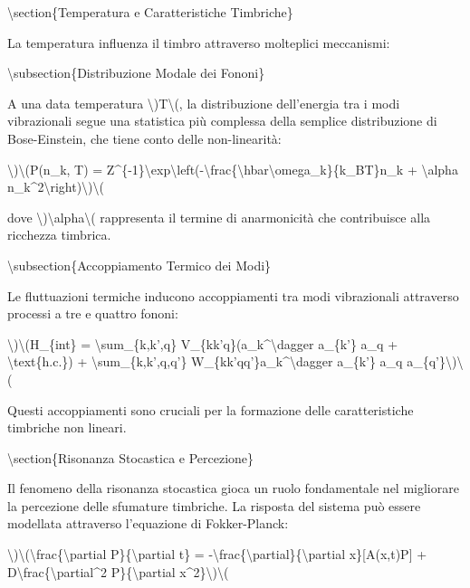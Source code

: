 \documentclass[a4paper,11pt]{article}
\begin{document}
\textbackslash{}section\{Temperatura e Caratteristiche Timbriche\}

La temperatura influenza il timbro attraverso molteplici meccanismi:

\textbackslash{}subsection\{Distribuzione Modale dei Fononi\}

A una data temperatura \textbackslash{})T\textbackslash{}(, la distribuzione dell'energia tra i modi
vibrazionali segue una statistica pi\`u complessa della semplice
distribuzione di Bose-Einstein, che tiene conto delle non-linearit\`a:

\textbackslash{})\textbackslash{}(P(n\_k, T) = Z\textasciicircum{}\{-1\}\textbackslash{}exp\textbackslash{}left(-\textbackslash{}frac\{\textbackslash{}hbar\textbackslash{}omega\_k\}\{k\_BT\}n\_k + \textbackslash{}alpha n\_k\textasciicircum{}2\textbackslash{}right)\textbackslash{})\textbackslash{}(

dove \textbackslash{})\textbackslash{}alpha\textbackslash{}( rappresenta il termine di anarmonicit\`a che contribuisce
alla ricchezza timbrica.

\textbackslash{}subsection\{Accoppiamento Termico dei Modi\}

Le fluttuazioni termiche inducono accoppiamenti tra modi vibrazionali
attraverso processi a tre e quattro fononi:

\textbackslash{})\textbackslash{}(H\_\{int\} = \textbackslash{}sum\_\{k,k',q\} V\_\{kk'q\}(a\_k\textasciicircum{}\textbackslash{}dagger a\_\{k'\} a\_q + \textbackslash{}text\{h.c.\}) +
    \textbackslash{}sum\_\{k,k',q,q'\} W\_\{kk'qq'\}a\_k\textasciicircum{}\textbackslash{}dagger a\_\{k'\} a\_q a\_\{q'\}\textbackslash{})\textbackslash{}(

Questi accoppiamenti sono cruciali per la formazione delle
caratteristiche timbriche non lineari.

\textbackslash{}section\{Risonanza Stocastica e Percezione\}

Il fenomeno della risonanza stocastica gioca un ruolo fondamentale nel
migliorare la percezione delle sfumature timbriche. La risposta del
sistema pu\`o essere modellata attraverso l'equazione di Fokker-Planck:

\textbackslash{})\textbackslash{}(\textbackslash{}frac\{\textbackslash{}partial P\}\{\textbackslash{}partial t\} = -\textbackslash{}frac\{\textbackslash{}partial\}\{\textbackslash{}partial x\}[A(x,t)P] + D\textbackslash{}frac\{\textbackslash{}partial\textasciicircum{}2 P\}\{\textbackslash{}partial x\textasciicircum{}2\}\textbackslash{})\textbackslash{}(
\end{document}
